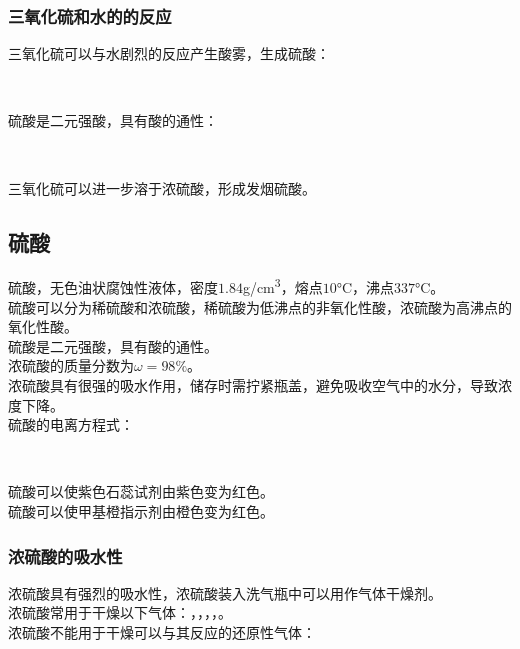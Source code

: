 \documentclass[UTF8]{ctexart}
\begin{document}
\subsubsection{三氧化硫和水的的反应}
    三氧化硫可以与水剧烈的反应产生酸雾，生成硫酸：
    \begin{center}
        \\[4mm]
    \end{center}
    硫酸是二元强酸，具有酸的通性：
    \begin{center}
        \\[4mm]
    \end{center}
    三氧化硫可以进一步溶于浓硫酸，形成发烟硫酸。

\newpage

\subsection{硫酸}
    硫酸，无色油状腐蚀性液体，密度$1.84$\si{g/cm^3}，熔点$10$\si{\degreeCelsius}，沸点$337$\si{\degreeCelsius}。\\[3mm]
    硫酸可以分为稀硫酸和浓硫酸，稀硫酸为低沸点的非氧化性酸，浓硫酸为高沸点的氧化性酸。\\[3mm]
    硫酸是二元强酸，具有酸的通性。\\[6mm]
    浓硫酸的质量分数为$\omega=98\%$。\\[3mm]
    浓硫酸具有很强的吸水作用，储存时需拧紧瓶盖，避免吸收空气中的水分，导致浓度下降。\\[6mm]
    硫酸的电离方程式：
    \begin{center}
        \\[4mm]
    \end{center}
    硫酸可以使紫色石蕊试剂由紫色变为红色。\\[3mm]
    硫酸可以使甲基橙指示剂由橙色变为红色。

\subsubsection{浓硫酸的吸水性}
    浓硫酸具有强烈的吸水性，浓硫酸装入洗气瓶中可以用作气体干燥剂。\\[3mm]
    浓硫酸常用于干燥以下气体：，，，，。\\[3mm]
    浓硫酸不能用于干燥可以与其反应的还原性气体：
    \begin{center}
        \\[3mm]
    \end{center}
\end{document}
